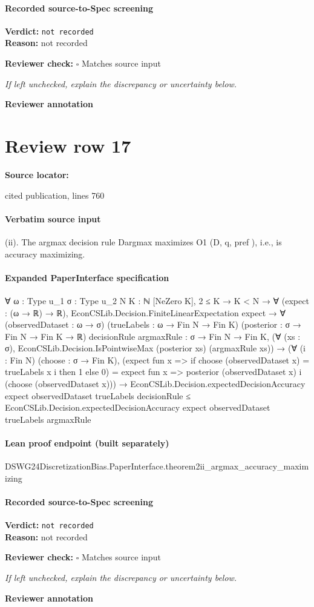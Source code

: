 \documentclass[10pt]{article}
\newcommand{\reviewerbox}{%
  \par\noindent\fbox{\parbox{0.96\linewidth}{\rule{0pt}{0.38in}}}\par
}
\newcommand{\reviewmatch}[1]{%
  \par\noindent\textbf{Reviewer check:} $\square$\; #1\par
  \noindent\emph{If left unchecked, explain the discrepancy or uncertainty below.}\par
}
\begin{document}
\paragraph{Recorded source-to-Spec screening}
\textbf{Verdict:} \texttt{not recorded}
\\
\textbf{Reason:} not recorded
\reviewmatch{Matches source input}
\noindent\textbf{Reviewer annotation}\par
\reviewerbox
\clearpage
\hypertarget{source-claim-cc8ba41c41752422}{}
\section*{Review row 17}
\textbf{Source locator:} {\footnotesize\raggedright cited publication, lines 760\par}
\paragraph{Verbatim source input}
\begin{ReviewVerbatim}
(ii). The argmax decision rule Dargmax maximizes O1 (D, q, pref ), i.e., is accuracy maximizing.
\end{ReviewVerbatim}


\paragraph{Expanded PaperInterface specification}
\begin{ReviewVerbatim}
∀ {ω : Type u_1} {σ : Type u_2} {N K : ℕ} [NeZero K],
  2 ≤ K →
    K < N →
      ∀ (expect : (ω → ℝ) → ℝ),
        EconCSLib.Decision.FiniteLinearExpectation expect →
          ∀ (observedDataset : ω → σ) (trueLabels : ω → Fin N → Fin K) (posterior : σ → Fin N → Fin K → ℝ)
            {decisionRule argmaxRule : σ → Fin N → Fin K},
            (∀ (xs : σ), EconCSLib.Decision.IsPointwiseMax (posterior xs) (argmaxRule xs)) →
              (∀ (i : Fin N) (choose : σ → Fin K),
                  (expect fun x => if choose (observedDataset x) = trueLabels x i then 1 else 0) =
                    expect fun x => posterior (observedDataset x) i (choose (observedDataset x))) →
                EconCSLib.Decision.expectedDecisionAccuracy expect observedDataset trueLabels decisionRule ≤
                  EconCSLib.Decision.expectedDecisionAccuracy expect observedDataset trueLabels argmaxRule
\end{ReviewVerbatim}

\paragraph{Lean proof endpoint (built separately)}\begin{ReviewVerbatim}
DSWG24DiscretizationBias.PaperInterface.theorem2ii_argmax_accuracy_maximizing
\end{ReviewVerbatim}

\paragraph{Recorded source-to-Spec screening}
\textbf{Verdict:} \texttt{not recorded}
\\
\textbf{Reason:} not recorded
\reviewmatch{Matches source input}
\noindent\textbf{Reviewer annotation}\par
\reviewerbox
\end{document}
